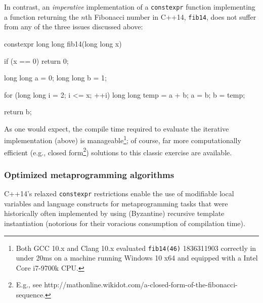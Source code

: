 In contrast, an \emph{imperative} implementation of a \lstinline!constexpr!
function implementing a function returning the $n$th Fibonacci
number in C++14, \lstinline!fib14!, does not suffer from any of the three
issues discussed above:

\begin{emcppslisting}[emcppsstandards={c++14}]
constexpr long long fib14(long long x)
{
    if (x == 0) { return 0; }

    long long a = 0;
    long long b = 1;

    for (long long i = 2; i <= x; ++i)
    {
        long long temp = a + b;
        a = b;
        b = temp;
    }

    return b;
}
\end{emcppslisting}

\noindent As one would expect, the compile time required to evaluate the iterative
implementation (above) is manageable{\cprotect\footnote{Both GCC 10.x
and Clang 10.x evaluated \lstinline!fib14(46)! 1836311903 correctly in
under 20ms on a machine running Windows 10 x64 and equipped with a
  Intel Core i7-9700k CPU.}}; of course, far more
computationally efficient (e.g., closed form{\cprotect\footnote{E.g.,
see
  http://mathonline.wikidot.com/a-closed-form-of-the-fibonacci-sequence.}})
solutions to this classic exercise are available.

\subsubsection[Optimized metaprogramming algorithms]{Optimized metaprogramming algorithms}\label{optimized-metaprogramming-algorithms}

C++14's relaxed \lstinline!constexpr! restrictions enable the use of
modifiable local variables and  language constructs
for metaprogramming tasks that were historically often implemented by
using (Byzantine) recursive template instantiation (notorious for their
voracious consumption of compilation time).

